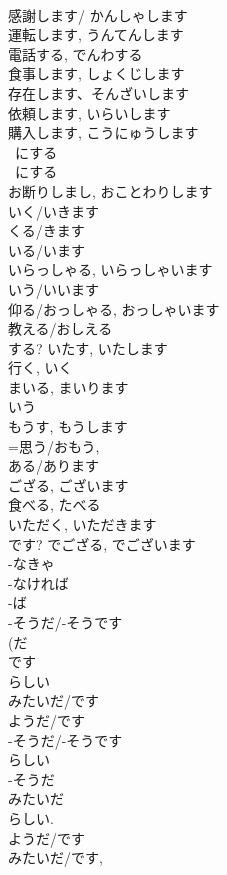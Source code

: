 \documentclass[8pt]{extreport}
\begin{document}
\begin{CJK}{UTF8}{min}
\\	感謝します/ かんしゃします		
\\	運転します, うんてんします		
\\	電話する, でんわする		
\\	食事します, しょくじします		
\\	存在します、そんざいします		
\\	依頼します, いらいします		
\\	購入します, こうにゅうします		
\\	~にする	
\\	~にする	
\\	お断りしまし, おことわりします 
\\	いく/いきます 
\\	くる/きます
\\	いる/います
\\	いらっしゃる, いらっしゃいます	
\\	いう/いいます 
\\	仰る/おっしゃる, おっしゃいます	
\\	教える/おしえる 
\\	する?	いたす, いたします	
\\	行く, いく 
\\	まいる, まいります	
\\	いう 
\\	もうす, もうします	
\\	=思う/おもう, 
\\	ある/あります 
\\	ござる, ございます	
\\	食べる, たべる 
\\	いただく, いただきます	
\\	です?	でござる, でございます	
\\	-なきゃ 
\\	-なければ 
\\	-ば 
\\	-そうだ/-そうです
\\	(だ 
\\	です
\\	らしい 
\\	みたいだ/です 
\\	ようだ/です
\\	-そうだ/-そうです
\\	らしい 
\\	-そうだ 
\\	みたいだ 
\\	らしい. 
\\	ようだ/です
\\	みたいだ/です, 

\end{CJK}
\end{document}
